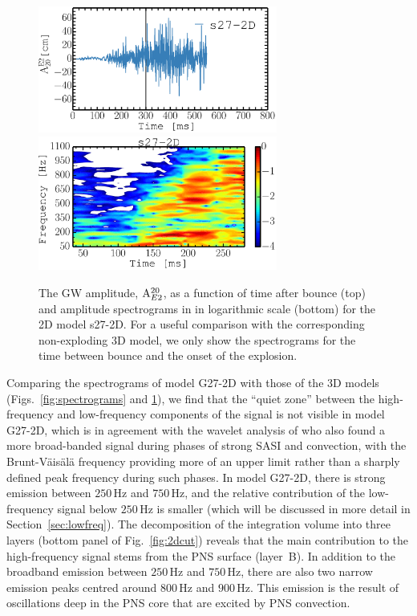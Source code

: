 \begin{figure}
\centering
\includegraphics[width=0.7\textwidth]{./images/paper1/fig8a.pdf} \\
\includegraphics[width=0.7\textwidth]{./images/paper1/fig8b.pdf} 
\caption{The GW amplitude, $\mathrm{A}_{\mathrm\mathrm{E2}}^{\mathrm{20}}$, as a function of time after bounce (top)
and amplitude spectrograms in in logarithmic scale (bottom) for the 2D model s27-2D. 
For a useful comparison with the corresponding non-exploding 3D model, we only
show the spectrograms for the time between bounce and the onset of the explosion.
\label{fig:s272d}}
\end{figure}



Comparing the spectrograms of model G27-2D with those of the 3D models
(Figs.~\ref{fig:spectrograms} and \ref{fig:s272d}), we find that the
``quiet zone'' between the high-frequency and low-frequency components
of the signal is not {visible} in model G27-2D, which is in
agreement with the wavelet analysis of \citet{mueller_13} who also
found a more broad-banded signal during phases of strong SASI and
convection, with the Brunt-V\"{a}is\"{a}l\"{a} frequency providing
more of an upper limit rather than a sharply defined peak frequency
during such phases. In model G27-2D, there is strong emission between
$250 \, \mathrm{Hz}$ and $750 \, \mathrm{Hz}$, and the relative
contribution of the low-frequency signal below $250 \, \mathrm{Hz}$ is
smaller (which will be discussed in more detail in
Section~\ref{sec:lowfreq}).  The decomposition of the integration
volume into three layers (bottom panel of Fig.~\ref{fig:2dcut}) reveals
that the main contribution to the high-frequency signal stems from the
PNS surface (layer~B).  In addition to the broadband emission between
$250 \, \mathrm{Hz}$ and $750 \, \mathrm{Hz}$, there are also two
narrow emission peaks centred around $800 \, \mathrm{Hz}$ and $900 \,
\mathrm{Hz}$.  This emission is the result of oscillations deep in the
PNS core that are excited by PNS convection.

